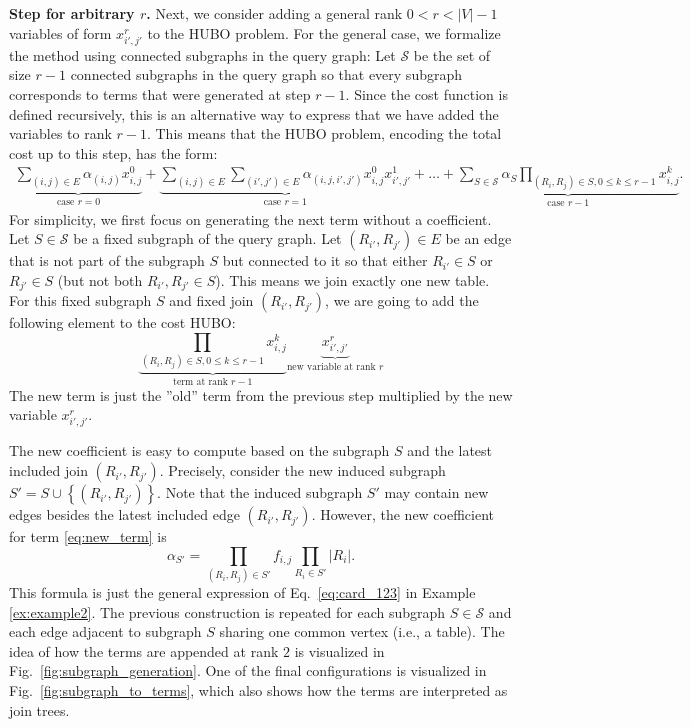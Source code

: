 \textbf{Step for arbitrary $r$.} Next, we consider adding a general rank $0 < r < |V| - 1$ variables of form $x_{i', j'}^{r}$ to the HUBO problem. For the general case, we formalize the method using connected subgraphs in the query graph: Let $\mathcal{S}$ be the set of size $r-1$ connected subgraphs in the query graph so that every subgraph corresponds to terms that were generated at step $r-1$. Since the cost function is defined recursively, this is an alternative way to express that we have added the variables to rank $r - 1$. This means that the HUBO problem, encoding the total cost up to this step, has the form:
\begin{align*}
    \underbrace{\sum_{(i, j) \in E}\alpha_{(i,j)} x_{i,j}^{0}}_{\text{case } r = 0} + \underbrace{\sum_{(i, j) \in E}\sum_{(i', j') \in E} \alpha_{(i,j,i',j')} x_{i,j}^{0}x_{i', j'}^{1}}_{\text{case } r = 1} + \ldots  
    + \underbrace{\sum_{S \in \mathcal{S}}\alpha_{S}\prod_{(R_i, R_j) \in S, 0\leq k \leq r - 1} x_{i,j}^{k}}_{\text{case } r - 1}.
\end{align*}
For simplicity, we first focus on generating the next term without a coefficient. Let $S \in \mathcal{S}$ be a fixed subgraph of the query graph. Let $(R_{i'}, R_{j'}) \in E$ be an edge that is not part of the subgraph $S$ but connected to it so that either $R_{i'} \in S$ or $R_{j'} \in S$ (but not both $R_{i'}, R_{j'} \in S$). This means we join exactly one new table. For this fixed subgraph $S$ and fixed join $(R_{i'}, R_{j'})$, we are going to add the following element to the cost HUBO:
\begin{equation}\label{eq:new_term}
\underbrace{\prod_{(R_i, R_j) \in S, 0\leq k \leq r - 1} x_{i,j}^{k}}_{\text{term at rank } r - 1} \underbrace{x_{i',j'}^{r}}_{\text{new variable at rank } r}
\end{equation}
The new term is just the ''old'' term from the previous step multiplied by the new variable $x_{i',j'}^{r}$.

The new coefficient is easy to compute based on the subgraph $S$ and the latest included join $(R_{i'}, R_{j'})$. Precisely, consider the new induced subgraph $S' = S \cup \left\{(R_{i'}, R_{j'})\right\}$. Note that the induced subgraph $S'$ may contain new edges besides the latest included edge $(R_{i'}, R_{j'})$. However, the new coefficient for term \eqref{eq:new_term} is
\begin{equation}\label{eq:term_coefficient}
\alpha_{S'} = \prod_{(R_i, R_j) \in S'}f_{i,j}\prod_{R_i \in S'}|R_i|.
\end{equation}
This formula is just the general expression of Eq.~\eqref{eq:card_123} in Example \ref{ex:example2}. The previous construction is repeated for each subgraph $S \in \mathcal{S}$ and each edge adjacent to subgraph $S$ sharing one common vertex (i.e., a table). The idea of how the terms are appended at rank $2$ is visualized in Fig.~\ref{fig:subgraph_generation}. One of the final configurations is visualized in Fig.~\ref{fig:subgraph_to_terms}, which also shows how the terms are interpreted as join trees.

